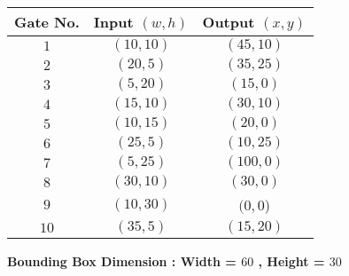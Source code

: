 \documentclass[12pt, a4paper,openany]{article}
\begin{document}
\begin{center}
\begin{tabular}{|c|c|c|}
    \hline
    \rowcolor[HTML]{DAE8FC} Gate No. &
    Input \((w,h)\)                                    & Output \((x,y)\)  \\ \hline
    \rowcolor[HTML]{FFFC9E} {\color[HTML]{000000}\(1\)} &
    {\color[HTML]{000000} \((10,10)\)}                         & {\color[HTML]{000000} \((45,10)\)}    \\ \hline
    \rowcolor[HTML]{FFFC9E} 
    {\color[HTML]{000000} \(2\)} &
    {\color[HTML]{000000} \((20,5)\)}                         & {\color[HTML]{000000} \((35,25)\)}      \\ \hline
     \rowcolor[HTML]{FFFC9E} 
     {\color[HTML]{000000} \(3\)} &
    {\color[HTML]{000000} \((5,20)\)}                         & {\color[HTML]{000000} \((15,0)\)}      \\ \hline
    \rowcolor[HTML]{FFFC9E} {\color[HTML]{000000}\(4\)} &
    {\color[HTML]{000000} \((15,10)\)}                         & {\color[HTML]{000000} \((30,10)\)}    \\ \hline
    \rowcolor[HTML]{FFFC9E} 
    {\color[HTML]{000000} \(5\)} &
    {\color[HTML]{000000} \((10,15)\)}                         & {\color[HTML]{000000} \((20,0)\)}      \\ \hline
     \rowcolor[HTML]{FFFC9E} 
     {\color[HTML]{000000} \(6\)} &
    {\color[HTML]{000000} \((25,5)\)}                         & {\color[HTML]{000000} \((10,25)\)}      \\ \hline
    \rowcolor[HTML]{FFFC9E} {\color[HTML]{000000}\(7\)} &
    {\color[HTML]{000000} \((5,25)\)}                         & {\color[HTML]{000000} \((100,0)\)}    \\ \hline
    \rowcolor[HTML]{FFFC9E} 
    {\color[HTML]{000000} \(8\)} &
    {\color[HTML]{000000} \((30,10)\)}                         & {\color[HTML]{000000} \((30,0)\)}      \\ \hline
     \rowcolor[HTML]{FFFC9E} 
     {\color[HTML]{000000} \(9\)} &
    {\color[HTML]{000000} \((10,30)\)}                         & {\color[HTML]{000000} \((0,0\))}      \\ \hline
    \rowcolor[HTML]{FFFC9E} {\color[HTML]{000000}\(10\)} &
    {\color[HTML]{000000} \((35,5)\)}                         & {\color[HTML]{000000} \((15,20)\)}    \\ \hline
    
    
\end{tabular}
\end{center}
\begin{center}
\textbf{Bounding Box Dimension : Width = \(60\) , Height = \(30\)}     
\end{center}
\end{document}
